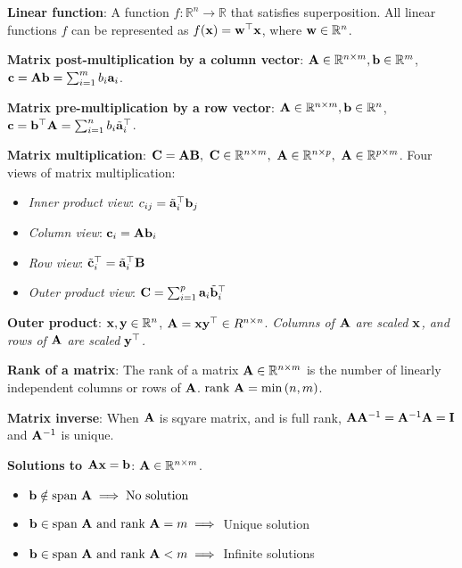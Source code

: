 \documentclass[letterpaper, twocolumn, 11pt]{article}
\newcommand{\R}{\mathbb{R}}	%
\newcommand{\1}{\mathds{1}}	%
\theoremstyle{definition}
\def\mf{\ensuremath\mathbf}
\def\lp{\ensuremath\left(}
\def\rp{\ensuremath\right)}
\begin{document}
\textbf{Linear function}: A function $f: \R^n \to \R$ that satisfies superposition. All linear functions $f$ can be represented as $f(\mf{x}) = \mf{w}^\top \mf{x}$, where $\mf{w} \in \R^n$.

\textbf{Matrix post-multiplication by a column vector}: $\mf{A} \in \R^{n \times m}, \mf{b} \in \R^m$, $\mf{c} = \mf{A}\mf{b} = \sum_{i=1}^m b_i \mf{a}_i$.

\textbf{Matrix pre-multiplication by a row vector}: $\mf{A} \in \R^{n \times m}, \mf{b} \in \R^n$, $\mf{c} = \mf{b}^\top\mf{A} = \sum_{i=1}^n b_i \tilde{\mf{a}}_i^\top$.

\textbf{Matrix multiplication}: $\mf{C} = \mf{A}\mf{B}, \,\, \mf{C} \in \R^{n \times m}, \,\, \mf{A} \in \R^{n \times p}, \,\, \mf{A} \in \R^{p \times m}$. Four views of matrix multiplication: 
\vspace{-2.5em}

\begin{itemize}
  \item \textit{Inner product view}: $c_{ij} = \tilde{\mf{a}}_i^\top\mf{b}_j$ \vspace{-0.75em}
  \item \textit{Column view}: $\mf{c}_{i} = \mf{A}\mf{b}_i$  \vspace{-0.75em}
  \item \textit{Row view}: $\tilde{\mf{c}}_{i}^\top = \tilde{\mf{a}}_i^\top\mf{B}$  \vspace{-0.75em}
  \item \textit{Outer product view}: $\mf{C} = \sum_{i=1}^p \mf{a}_i\tilde{\mf{b}}_i^\top$ \vspace{-0.75em}
\end{itemize}

\textbf{Outer product}: $\mf{x}, \mf{y} \in \R^{n}$, $\mf{A} = \mf{x}\mf{y}^\top \in R^{n \times n}$. \textit{Columns of $\mf{A}$ are scaled $\mf{x}$, and rows of $\mf{A}$ are scaled $\mf{y}^\top$.}

\textbf{Rank of a matrix}: The rank of a matrix $\mf{A} \in \R^{n \times m}$ is the number of linearly independent columns or rows of $\mf{A}$. $\text{rank } \mf{A} = \min \lp n, m\rp$.

\textbf{Matrix inverse}: When $\mf{A}$ is sqyare matrix, and is full rank, $\mf{A}\mf{A}^{-1} = \mf{A}^{-1}\mf{A} = \mf{I}$ and $\mf{A}^{-1}$ is unique.

\textbf{Solutions to $\mf{A}\mf{x} = \mf{b}$}: $\mf{A} \in \R^{n \times m}$. \vspace{-1.25em}
\begin{itemize}
  \item $\mf{b} \notin \text{span }\mf{A} \implies \text{No solution}$ \vspace{-0.75em}
  \item $\mf{b} \in \text{span }\mf{A} \text{ and } \text{rank }\mf{A} = m \implies$ Unique solution \vspace{-0.75em}
  \item $\mf{b} \in \text{span }\mf{A} \text{ and } \text{rank }\mf{A} < m \implies$ Infinite solutions \vspace{-0.75em}
\end{itemize}
\end{document}

